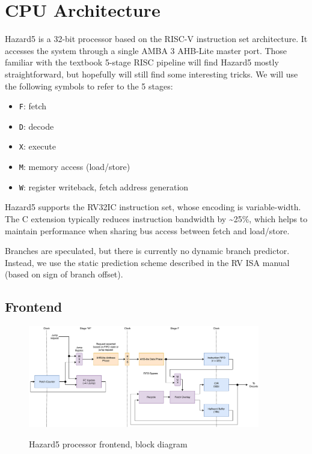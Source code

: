 \section{CPU Architecture}

Hazard5 is a 32-bit processor based on the RISC-V instruction set architecture. It accesses the system through a single AMBA 3 AHB-Lite master port. Those familiar with the textbook 5-stage RISC pipeline will find Hazard5 mostly straightforward, but hopefully will still find some interesting tricks. We will use the following symbols to refer to the 5 stages:

\begin{itemize}
\item {\tt F}: fetch
\item {\tt D}: decode
\item {\tt X}: execute
\item {\tt M}: memory access (load/store)
\item {\tt W}: register writeback, fetch address generation
\end{itemize}


Hazard5 supports the RV32IC instruction set, whose encoding is variable-width. The C extension typically reduces instruction bandwidth by \textasciitilde 25\%, which helps to maintain performance when sharing bus access between fetch and load/store.

Branches are speculated, but there is currently no dynamic branch predictor. Instead, we use the static prediction scheme described in the RV ISA manual (based on sign of branch offset).

\subsection{Frontend}
\label{section:frontend}

\begin{figure}[!htb]
\centering
\caption{Hazard5 processor frontend, block diagram}
\includegraphics[width=0.9\textwidth]{diagrams/cpu_frontend.pdf}
\label{diagram:frontend}
\end{figure}

